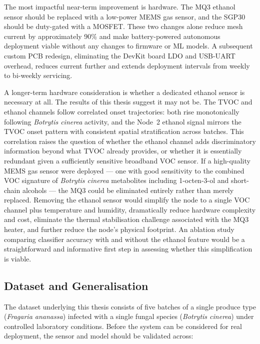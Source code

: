 The most impactful near-term improvement is hardware. The MQ3 ethanol sensor should be replaced with a low-power MEMS gas sensor, and the SGP30 should be duty-gated with a MOSFET. These two changes alone reduce mesh current by approximately 90\% and make battery-powered autonomous deployment viable without any changes to firmware or ML models. A subsequent custom PCB redesign, eliminating the DevKit board LDO and USB-UART overhead, reduces current further and extends deployment intervals from weekly to bi-weekly servicing.

A longer-term hardware consideration is whether a dedicated ethanol sensor is necessary at all. The results of this thesis suggest it may not be. The TVOC and ethanol channels follow correlated onset trajectories: both rise monotonically following \textit{Botrytis cinerea} activity, and the Node~2 ethanol signal mirrors the TVOC onset pattern with consistent spatial stratification across batches. This correlation raises the question of whether the ethanol channel adds discriminatory information beyond what TVOC already provides, or whether it is essentially redundant given a sufficiently sensitive broadband VOC sensor. If a high-quality MEMS gas sensor were deployed --- one with good sensitivity to the combined VOC signature of \textit{Botrytis cinerea} metabolites including 1-octen-3-ol and short-chain alcohols --- the MQ3 could be eliminated entirely rather than merely replaced. Removing the ethanol sensor would simplify the node to a single VOC channel plus temperature and humidity, dramatically reduce hardware complexity and cost, eliminate the thermal stabilisation challenge associated with the MQ3 heater, and further reduce the node's physical footprint. An ablation study comparing classifier accuracy with and without the ethanol feature would be a straightforward and informative first step in assessing whether this simplification is viable.

\subsection{Dataset and Generalisation}

The dataset underlying this thesis consists of five batches of a single produce type (\textit{Fragaria ananassa}) infected with a single fungal species (\textit{Botrytis cinerea}) under controlled laboratory conditions. Before the system can be considered for real deployment, the sensor and model should be validated across:

